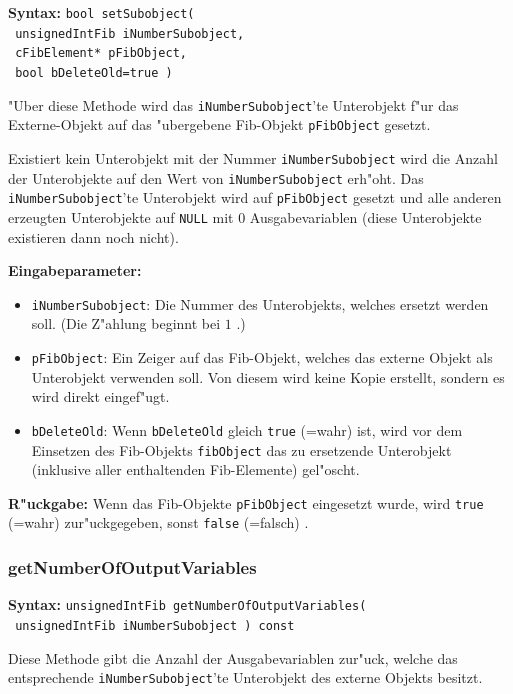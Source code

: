 \textbf{Syntax:} \verb|bool setSubobject(| \\\verb| unsignedIntFib iNumberSubobject,| \\\verb| cFibElement* pFibObject,| \\\verb| bool bDeleteOld=true )|

\bigskip\noindent
"Uber diese Methode wird das \verb|iNumberSubobject|'te Unterobjekt f"ur das Externe-Objekt auf das "ubergebene Fib-Objekt \verb|pFibObject| gesetzt.

Existiert kein Unterobjekt mit der Nummer \verb|iNumberSubobject| wird die Anzahl der Unterobjekte auf den Wert von \verb|iNumberSubobject| erh"oht. Das \verb|iNumberSubobject|'te Unterobjekt wird auf \verb|pFibObject| gesetzt und alle anderen erzeugten Unterobjekte auf \verb|NULL| mit $0$ Ausgabevariablen (diese Unterobjekte existieren dann noch nicht).

\bigskip\noindent
\textbf{Eingabeparameter:}
\begin{itemize}
 \item \verb|iNumberSubobject|: Die Nummer des Unterobjekts, welches ersetzt werden soll. (Die Z"ahlung beginnt bei $1$ .)
 \item \verb|pFibObject|: Ein Zeiger auf das Fib-Objekt, welches das externe Objekt als Unterobjekt verwenden soll. Von diesem wird keine Kopie erstellt, sondern es wird direkt eingef"ugt.
 \item \verb|bDeleteOld|: Wenn \verb|bDeleteOld| gleich \verb|true| (=wahr) ist, wird vor dem Einsetzen des Fib-Objekts \verb|fibObject| das zu ersetzende Unterobjekt (inklusive aller enthaltenden Fib-Elemente) gel"oscht.
\end{itemize}

\bigskip\noindent
\textbf{R"uckgabe:} Wenn das Fib-Objekte \verb|pFibObject| eingesetzt wurde, wird \verb|true| (=wahr) zur"uckgegeben, sonst \verb|false| (=falsch) .


\subsubsection{getNumberOfOutputVariables}

\textbf{Syntax:} \verb|unsignedIntFib getNumberOfOutputVariables(| \\\verb| unsignedIntFib iNumberSubobject ) const|

\bigskip\noindent
Diese Methode gibt die Anzahl der Ausgabevariablen zur"uck, welche das entsprechende \verb|iNumberSubobject|'te Unterobjekt des externe Objekts besitzt.

